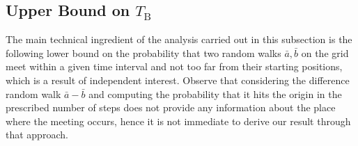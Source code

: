 \documentclass[11pt]{article}
\newcommand{\bt}{T_{\mathrm{B}}}
\begin{document}
\subsection{Upper Bound on $\bt$}
\label{sec:gsub}

The main technical ingredient of the analysis carried out in this
subsection is the following lower bound on the probability that two
random walks $\bar{a}, \bar{b}$ on the grid meet within a given time
interval and not too far from their starting positions, which is a
result of independent interest.  Observe that considering the
difference random walk $\bar{a} - \bar{b}$ and computing the
probability that it hits the origin in the prescribed number of steps
does not provide any information about the place where the meeting
occurs, hence it is not immediate to derive our result through that
approach.
\end{document}
